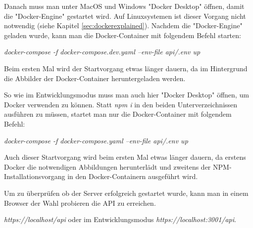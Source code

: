 Danach muss man unter MacOS und Windows "Docker Desktop" öffnen, damit die "Docker-Engine" gestartet wird. Auf Linuxsystemen ist dieser Vorgang nicht notwendig (siehe Kapitel \ref{sec:dockerexplained}). Nachdem die "Docker-Engine" geladen wurde, kann man die Docker-Container mit folgendem Befehl starten:

\emph{docker-compose -f docker-compose.dev.yaml --env-file api/.env up}  

Beim ersten Mal wird der Startvorgang etwas länger dauern, da im Hintergrund die Abbilder der Docker-Container heruntergeladen werden.


So wie im Entwicklungsmodus muss man auch hier "Docker Desktop" öffnen, um Docker verwenden zu können. Statt \emph{npm i} in den beiden Unterverzeichnissen ausführen zu müssen, startet man nur die Docker-Container mit folgendem Befehl:

\emph{docker-compose -f docker-compose.yaml --env-file api/.env up}

Auch dieser Startvorgang wird beim ersten Mal etwas länger dauern, da erstens Docker die notwendigen Abbildungen herunterlädt und zweitens der NPM-Installationsvorgang in den Docker-Containern ausgeführt wird.

Um zu überprüfen ob der Server erfolgreich gestartet wurde, kann man in einem Browser der Wahl probieren die API zu erreichen. 

\emph{https://localhost/api} oder im Entwicklungsmodus \emph{https://localhost:3001/api}.